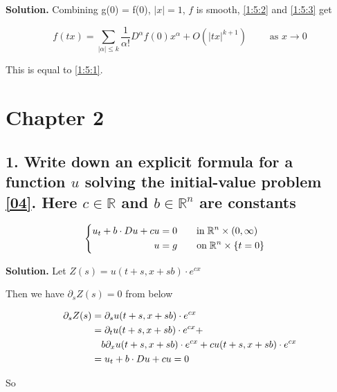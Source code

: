 \documentclass[a4paper]{book}
\newenvironment{solution}%
{\noindent\textbf{Solution.}}%
{\qedhere}
\numberwithin{equation}{chapter}
\theoremstyle{definition}
\begin{document}
\begin{multicols}{2}
\begin{solution}
	Combining g(0) = f(0), $|x| = 1$, $f$ is smooth, \ref{1:5:2} and \ref{1:5:3} get
	
	\begin{equation}
			f(tx) = \sum_{|\alpha| \leq k} \frac{1}{\alpha!} D^\alpha f(0) x^\alpha + O(|tx|^{k+1}) \qquad \text{ as } x \rightarrow 0
	\end{equation}
	
	This is equal to \ref{1:5:1}.
\end{solution}
%

\section{Chapter 2}
\subsection{1. Write down an explicit formula for a function $u$ solving the initial-value problem \ref{04}. Here $c \in \mathbb{R}$ and $ b \in \mathbb{R}^n $ are constants}

\begin{equation}\label{04}
	\begin{cases}
	\begin{aligned}
	u_t + b \cdot \mathnormal{D}u + cu &= 0 \qquad \text{in} \; \mathbb{R}^n \times (0,\infty)\\
		u &= g \qquad \text{on} \; \mathbb{R}^n \times \{ t = 0 \} 
		\end{aligned}
	\end{cases}
\end{equation}

\begin{solution}
	Let $Z(s) = u(t + s, x + sb) \cdot e^{cx}$
	
	Then we have $\partial_sZ(s) = 0$ from below
	
	
	\begin{equation}
	\begin{aligned}
		\partial_sZ(s) & = \partial_su(t + s, x + sb)\cdot e^{cx}    \\
		& = \partial_t u(t + s, x + sb)\cdot e^{cx} + \\
		& \quad b\partial_x u(t + s, x + sb)\cdot e^{cx} + cu(t + s, x + sb) \cdot e^{cx} \\
		& = u_t + b \cdot \mathnormal{D}u + cu = 0
		\end{aligned}
	\end{equation}
	
	So 
	

\end{solution}
\end{multicols}
\end{document}
